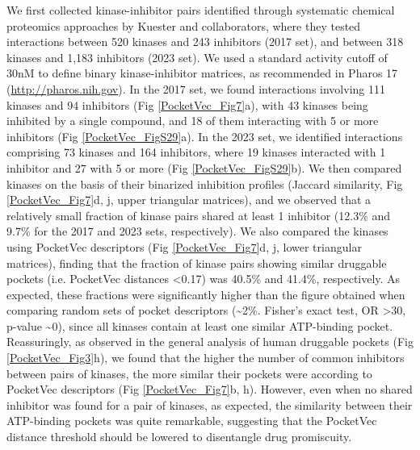 We first collected kinase-inhibitor pairs identified through systematic chemical proteomics approaches by Kuester and collaborators, where they tested interactions between 520 kinases and 243 inhibitors (2017 set)\cite{klaeger_target_2017}, and between 318 kinases and 1,183 inhibitors (2023 set)\cite{reinecke_chemical_2023}. We used a standard activity cutoff of 30nM to define binary kinase-inhibitor matrices, as recommended in Pharos 17 (\hyperlink{http://pharos.nih.gov}{http://pharos.nih.gov}). In the 2017 set, we found interactions involving 111 kinases and 94 inhibitors (Fig \ref{PocketVec_Fig7}a), with 43 kinases being inhibited by a single compound, and 18 of them interacting with 5 or more inhibitors (Fig \ref{PocketVec_FigS29}a). In the 2023 set, we identified interactions comprising 73 kinases and 164 inhibitors, where 19 kinases interacted with 1 inhibitor and 27 with 5 or more (Fig \ref{PocketVec_FigS29}b). We then compared kinases on the basis of their binarized inhibition profiles (Jaccard similarity, Fig \ref{PocketVec_Fig7}d, j, upper triangular matrices), and we observed that a relatively small fraction of kinase pairs shared at least 1 inhibitor (12.3\% and 9.7\% for the 2017 and 2023 sets, respectively). We also compared the kinases using PocketVec descriptors (Fig \ref{PocketVec_Fig7}d, j, lower triangular matrices), finding that the fraction of kinase pairs showing similar druggable pockets (i.e. PocketVec distances <0.17) was 40.5\% and 41.4\%, respectively. As expected, these fractions were significantly higher than the figure obtained when comparing random sets of pocket descriptors (\textasciitilde2\%. Fisher’s exact test, OR >30, p-value \textasciitilde0), since all kinases contain at least one similar ATP-binding pocket. Reassuringly, as observed in the general analysis of human druggable pockets (Fig \ref{PocketVec_Fig3}h), we found that the higher the number of common inhibitors between pairs of kinases, the more similar their pockets were according to PocketVec descriptors (Fig \ref{PocketVec_Fig7}b, h). However, even when no shared inhibitor was found for a pair of kinases, as expected, the similarity between their ATP-binding pockets was quite remarkable, suggesting that the PocketVec distance threshold should be lowered to disentangle drug promiscuity.



